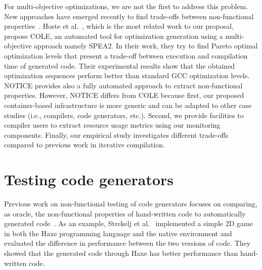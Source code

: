For multi-objective optimizations, we are not the first to address this problem. New approaches have emerged recently to find trade-offs between non-functional properties~\cite{hoste2008cole,martinez2014multi,lokuciejewski2010multi}. Hoste et al.~\cite{hoste2008cole}, which is the most related work to our proposal, propose COLE, an automated tool for optimization generation using a multi-objective approach namely SPEA2. In their work, they try to find Pareto optimal optimization levels that present a trade-off between execution and compilation time of generated code. Their experimental results show that the obtained optimization sequences perform better than standard GCC optimization levels. NOTICE provides also a fully automated approach to extract non-functional properties. However, NOTICE differs from COLE because first, our proposed container-based infrastructure is more generic and can be adapted to other case studies (i.e., compilers, code generators, etc.). Second, we provide facilities to compiler users to extract resource usage metrics using our monitoring components. Finally, our empirical study investigates different trade-offs compared to previous work in iterative compilation.
\fi







\section{Testing code generators}
Previous work on non-functional testing of code generators focuses on comparing, as oracle, the non-functional properties of hand-written code to automatically generated code~\cite{stepasyuk2015evaluating,richard2013efficient}. As an example, Strekelj et al.~\cite{vstrekelj2015performance} implemented a simple 2D game in both the Haxe programming language and the native environment and evaluated the difference in performance between the two versions of code. They showed that the generated code through Haxe has better performance than hand-written code. 

